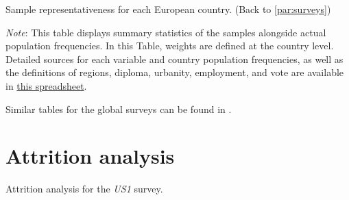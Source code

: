 \begin{table}[h]
    \caption[Sample representativeness of each European country]{Sample representativeness for each European country. (Back to \ref{par:surveys})} \label{tab:representativeness_EU}
    \makebox[\textwidth][c]{
        \resizebox*{!}{.50\textheight}{%
        
        }
    }
    {\footnotesize \textit{Note}: This table displays summary statistics of the samples alongside actual population frequencies. In this Table, weights are defined at the country level.  %
    Detailed sources for each variable and country population frequencies, as well as the definitions of regions, diploma, urbanity, employment, and vote are available in \href{https://github.com/bixiou/international_attitudes_toward_global_policies/raw/main/questionnaire/specificities.xlsx}{this spreadsheet}. %
    }
\end{table}

Similar tables for the global surveys can be found in .

\clearpage
\section{Attrition analysis}\label{app:attrition}

\begin{table}[h]\label{tab:attrition_US1}
    \caption[Attrition analysis: \textit{US1}]{Attrition analysis for the \textit{US1} survey.} 
    \makebox[\textwidth][c]{
\resizebox*{!}{.73\textheight}{ %
        
        }
    }
    {\footnotesize %
    }
\end{table}

